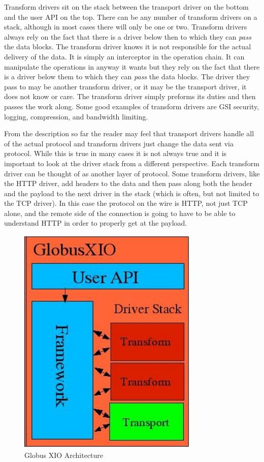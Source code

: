 \documentclass[11pt]{article}
\begin{document}
Transform drivers sit on the stack between the transport driver on the
bottom and the user API on the top.  There can be any number of transform
drivers on a stack, although in most cases there will only be one or 
two.  Transform drivers always rely on the fact that there is a driver
below then to which they can \emph{pass} the data blocks.  The transform
driver knows it is not responsible for the actual delivery of the data.
It is simply an interceptor in the operation chain.  It can manipulate
the operations in anyway it wants but they rely on the fact that there is
a driver below them to which they can \emph{pass} the data blocks.  The 
driver they pass to may be another transform driver, or it may be the
transport driver, it does not know or care.  The transform driver simply
preforms its duties and then passes the work along.  Some good examples
of transform drivers are GSI security, logging, compression, 
and bandwidth limiting.

From the description so far the reader may feel that transport drivers
handle all of the actual protocol and transform drivers just change the
data sent via protocol.  While this is true in many cases
it is not always true and it is important to look at the driver
stack from a different perspective.  Each transform driver can be 
thought of as another layer of protocol.  Some transform drivers, like the
HTTP driver, add headers to the data and then pass along both the
header and the payload to the next driver in the stack (which is often,
but not limited to the TCP driver).  In this case the protocol on the
wire is HTTP, not just TCP alone, and the remote side of the connection is
going to have to be able to understand HTTP in order to properly get
at the payload.

\begin{figure}
\centerline{\includegraphics[width=3.4in]{figure1}}
\vspace*{-2.0ex}
\caption{Globus XIO Architecture}
\label{arch}
\end{figure}
\end{document}
